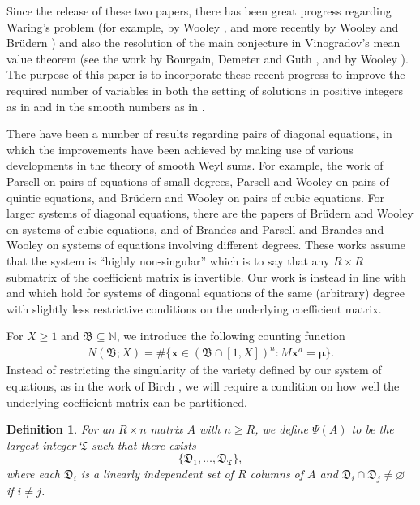 \documentclass[reqno, 12pt, reqno]{amsart}
\numberwithin{equation}{section}
\newtheorem{definition}[theorem]{Definition}
\newcommand{\NN}{\mathbb{N}}
\renewcommand{\emptyset}{\varnothing}
\renewcommand{\geq}{\geqslant}
\newcommand{\x}{\mathbf{x}}
\renewcommand{\=}{\equiv}
\begin{document}
Since the release of these two papers, there has been great progress regarding Waring's problem
(for example, by Wooley \cite{Woooo92}, \cite{Woo95} and more recently by Wooley and Br\"{u}dern \cite{BruWoo})
and also the resolution of the main conjecture in Vinogradov's mean value theorem (see the work by Bourgain, Demeter and Guth \cite{BDG},
and by Wooley \cite{WooCub, Wooley}). The purpose of this paper is to incorporate these recent progress to improve the required number of variables 
in both the setting of solutions in positive integers as in \cite{DavenportLewis}
and in the smooth numbers as in \cite{BC}. 

There have been a number of results regarding pairs of diagonal equations, 
in which the improvements have been achieved by making use of various developments in the theory of smooth Weyl sums.    
For example,  the work of Parsell \cite{parsellpairs} on pairs of equations of small degrees,
Parsell and Wooley \cite{quintic} on pairs of quintic equations, 
and 
Br{\"u}dern and Wooley \cite{cubicpairs} on pairs of cubic equations. 
For larger systems of diagonal equations, there are the papers of  
Br{\"u}dern and Wooley \cite{cubicsystem} on systems of cubic equations,
and 
of  Brandes and Parsell \cite{brandesparsell} 
and Brandes and Wooley \cite{JuTr}
on systems of equations involving different degrees. These works assume that the system is 
``highly non-singular'' which is to say that any $R \times R$ submatrix of the coefficient matrix is invertible.  
Our work is instead in line with \cite{DavenportLewis} and \cite{BC} which hold for systems of diagonal equations of the same (arbitrary) degree with slightly less restrictive conditions on the underlying coefficient matrix. 



For $X \geq 1$ and $\mathfrak{B} \subseteq \NN$, we introduce the following counting function
\begin{align*}
N( \mathfrak{B}; X) = \#\{\x \in ( \mathfrak{B} \cap [1,X]  )^n:  M \x^d = \boldsymbol{\mu}  \}.
\end{align*}
%
Instead of restricting the singularity of the variety defined by our system of equations,
as in the work of Birch \cite{birch},
we will require a condition on how well the underlying coefficient matrix can be partitioned.
%
\begin{definition}
\label{TTT}
For an $R \times n$ matrix $A$ with $n \geq R$, we define $\Psi (A)$ to be the largest integer $\mathfrak{T}$ such that there exists
$$
\{ \mathfrak{D}_1, \ldots, \mathfrak{D}_\mathfrak{T} \},
$$
where each $\mathfrak{D}_i$ is a linearly independent set of $R$ columns of $A$ and $\mathfrak{D}_i \cap \mathfrak{D}_j \neq \emptyset$ if $i \neq j$.
\end{definition}
\end{document}

